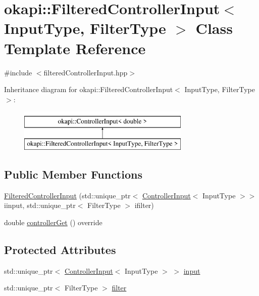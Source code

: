 \hypertarget{classokapi_1_1FilteredControllerInput}{}\section{okapi\+::Filtered\+Controller\+Input$<$ Input\+Type, Filter\+Type $>$ Class Template Reference}
\label{classokapi_1_1FilteredControllerInput}


{\ttfamily \#include $<$filtered\+Controller\+Input.\+hpp$>$}

Inheritance diagram for okapi\+::Filtered\+Controller\+Input$<$ Input\+Type, Filter\+Type $>$\+:\begin{figure}[H]
\begin{center}
\leavevmode
\includegraphics[height=2.000000cm]{classokapi_1_1FilteredControllerInput}
\end{center}
\end{figure}
\subsection*{Public Member Functions}
\begin{DoxyCompactItemize}
\item 
\mbox{\hyperlink{classokapi_1_1FilteredControllerInput_af39910d3a47b6b6bda5ca86b40667ace}{Filtered\+Controller\+Input}} (std\+::unique\+\_\+ptr$<$ \mbox{\hyperlink{classokapi_1_1ControllerInput}{Controller\+Input}}$<$ Input\+Type $>$$>$ iinput, std\+::unique\+\_\+ptr$<$ Filter\+Type $>$ ifilter)
\item 
double \mbox{\hyperlink{classokapi_1_1FilteredControllerInput_abc48c2eb875b0e927d0fd6b462d391d6}{controller\+Get}} () override
\end{DoxyCompactItemize}
\subsection*{Protected Attributes}
\begin{DoxyCompactItemize}
\item 
std\+::unique\+\_\+ptr$<$ \mbox{\hyperlink{classokapi_1_1ControllerInput}{Controller\+Input}}$<$ Input\+Type $>$ $>$ \mbox{\hyperlink{classokapi_1_1FilteredControllerInput_a402aed1f5ce334f1f2894026dfc80250}{input}}
\item 
std\+::unique\+\_\+ptr$<$ Filter\+Type $>$ \mbox{\hyperlink{classokapi_1_1FilteredControllerInput_abe6797c377795f6bf995053bbb46c870}{filter}}
\end{DoxyCompactItemize}


